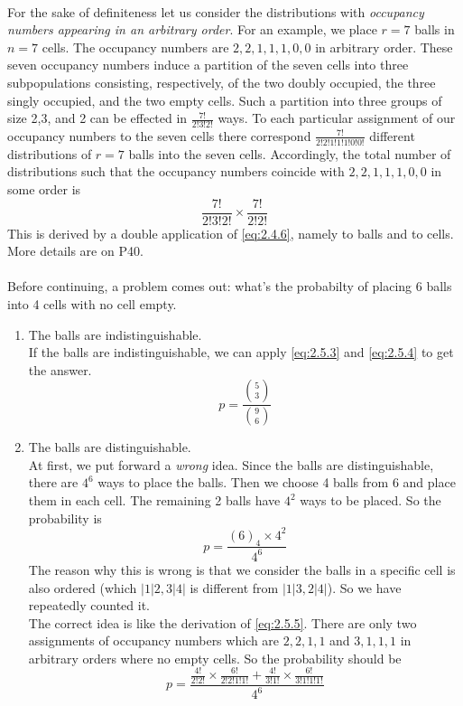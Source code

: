 \documentclass{article}
\numberwithin{equation}{subsection}
\begin{document}
		\paragraph{} For the sake of definiteness let us consider the distributions with \textit{occupancy numbers appearing in an arbitrary order}. For an example, we place $r=7$ balls in $n=7$ cells. The occupancy numbers are $2,2,1,1,1,0,0$ in arbitrary order. These seven occupancy numbers induce a partition of the seven cells into three subpopulations consisting, respectively, of the two doubly occupied, the three singly occupied, and the two empty cells. Such a partition into three groups of size 2,3, and 2 can be effected in $\frac{7!}{2!3!2!}$ ways. To each particular assignment of our occupancy numbers to the seven cells there correspond $\frac{7!}{2!2!1!1!1!0!0!}$ different distributions of $r=7$ balls into the seven cells. Accordingly, the total number of distributions such that the occupancy numbers coincide with $2,2,1,1,1,0,0$ in some order is \begin{equation}
			\label{eq:2.5.5}
			\frac{7!}{2!3!2!}\times\frac{7!}{2!2!}
		\end{equation} This is derived by a double application of \eqref{eq:2.4.6}, namely to balls and to cells. More details are on P40.
		\paragraph{}Before continuing, a problem comes out: what's the probabilty of placing 6 balls into 4 cells with no cell empty.
		\begin{enumerate}
		\item The balls are indistinguishable. \\ If the balls are indistinguishable, we can apply \eqref{eq:2.5.3} and \eqref{eq:2.5.4} to get the answer. $$p=\frac{{5\choose 3}}{{9\choose 6}}$$
		\item The balls are distinguishable. \\ At first, we put forward a \textit{wrong} idea. Since the balls are distinguishable, there are $4^6$ ways to place the balls. Then we choose 4 balls from 6 and place them in each cell. The remaining 2 balls have $4^2$ ways to be placed. So the probability is
		$$p=\frac{(6)_4\times 4^2}{4^6}$$
		The reason why this is wrong is that we consider the balls in a specific cell is also ordered (which $|1|2,3|4|$ is different from $|1|3,2|4|$). So we have repeatedly counted it. \\ The correct idea is like the derivation of \eqref{eq:2.5.5}. There are only two assignments of occupancy numbers which are $2,2,1,1$ and $3,1,1,1$ in arbitrary orders where no empty cells. So the probability should be $$p=\frac{\frac{4!}{2!2!}\times\frac{6!}{2!2!1!1!}+\frac{4!}{3!1!}\times\frac{6!}{3!1!1!1!}}{4^6}$$
		\end{enumerate}
\end{document}
